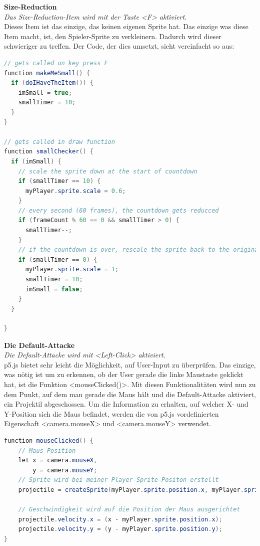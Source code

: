 \textbf{Size-Reduction}
\\
\textit{Das Size-Reduction-Item wird mit der Taste <F> aktiviert.}
\\
Dieses Item ist das einzige, das keinen eigenen Sprite hat. Das einzige was diese Item macht, ist, den Spieler-Sprite zu verkleinern. Dadurch wird dieser schwieriger zu treffen.
Der Code, der dies umsetzt, sieht vereinfacht so aus:
\\
\begin{lstlisting}[caption=Size-Reduction,language=Java,label=lst:impl:sizeReduc]
// gets called on key press F
function makeMeSmall() {
  if (doIHaveTheItem()) {
    imSmall = true;
    smallTimer = 10;
  }
}

// gets called in draw function
function smallChecker() {
  if (imSmall) {
    // scale the sprite down at the start of countdown
    if (smallTimer == 10) {
      myPlayer.sprite.scale = 0.6;
    }
    // every second (60 frames), the countdown gets reducced
    if (frameCount % 60 == 0 && smallTimer > 0) {
      smallTimer--;
    }
    // if the countdown is over, rescale the sprite back to the original form
    if (smallTimer == 0) {
      myPlayer.sprite.scale = 1;
      smallTimer = 10;
      imSmall = false;
    }
  }

}
\end{lstlisting}

\textbf{Die Default-Attacke}
\\
\textit{Die Default-Attacke wird mit <Left-Click> aktiviert.}
\\
p5.js bietet sehr leicht die Möglichkeit, auf User-Input zu überprüfen. Das einzige, was nötig ist um zu erkennen, ob der User gerade die linke Maustaste geklickt hat, ist die Funktion <mouseClicked()>.
Mit diesen Funktionalitäten wird nun zu dem Punkt, auf dem man gerade die Maus hält und die Default-Attacke aktiviert, ein Projektil abgeschossen. Um die Information zu erhalten, auf welcher X- und Y-Position sich die Maus befindet,
 werden die von p5.js vordefinierten Eigenschaft <camera.mouseX> und <camera.mouseY> verwendet.
\\
\begin{lstlisting}[caption=Default-Attacke,language=Java,label=lst:impl:defaultAttack]
    function mouseClicked() {
    // Maus-Position
    let x = camera.mouseX,
        y = camera.mouseY;
    // Sprite wird bei meiner Player-Sprite-Positon erstellt
    projectile = createSprite(myPlayer.sprite.position.x, myPlayer.sprite.position.y, pixelWidth, pixelWidth);
      
    // Geschwindigkeit wird auf die Position der Maus ausgerichtet
    projectile.velocity.x = (x - myPlayer.sprite.position.x);
    projectile.velocity.y = (y - myPlayer.sprite.position.y);
}

\end{lstlisting}

